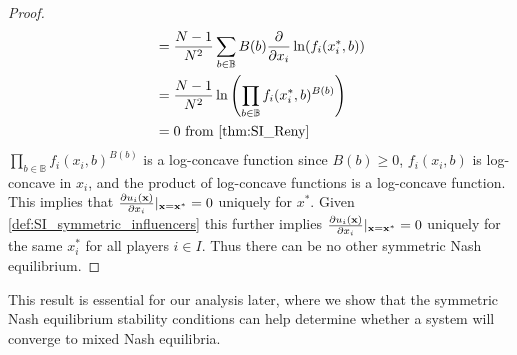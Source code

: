 \documentclass{article}
\newcommand {\B}{\mathbb{B}}
\begin{document}
\begin{proof}
\begin{align}
                     &=\frac{N-1}{N^2}\sum_{b\in\mathbb{B}} B(b)\pdv{}{x_i}\ln(f_i(x_i^*,b)) \\ %
                     &=\frac{N-1}{N^2}\ln\left(\prod_{b\in \B}f_i(x_i^*,b)^{B(b)}\right) \\ %
                     &=0 \text{ from \cref{thm:SI_Reny}}
                 \end{align}
                 $\prod_{b\in \B}f_i(x_i,b)^{B(b)}$ is a log-concave function since $B(b)\geq0$, $f_i(x_i,b)$ is log-concave in $x_i$, and the product of log-concave functions is a log-concave function. This implies that $\pdv{u_i(\mathbf{x})}{x_i}|_{\mathbf{x}=\mathbf{x^*}}=0$ uniquely for $x^*$. Given \cref{def:SI_symmetric_influencers} this further implies $\pdv{u_i(\mathbf{x})}{x_i}|_{\mathbf{x}=\mathbf{x^*}}=0 $ uniquely for the same $x^*_i$ for all players $i\in I$. Thus there can be no other symmetric Nash equilibrium.  
             \end{proof}
             This result is essential for our analysis later, where we show that the symmetric Nash equilibrium stability conditions can help determine whether a system will converge to mixed Nash equilibria. 
             
\end{document}
